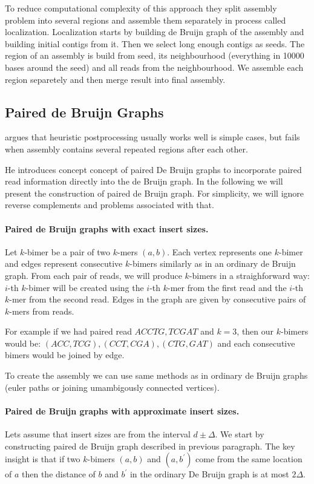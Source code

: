 To reduce computational complexity of this approach they split assembly problem
into several regions and assemble them separately in process called localization.
Localization starts by building de Bruijn graph of the assembly and building initial
contigs from it. Then we select long enough contigs as seeds. 
The region of an assembly is build from seed, its neighbourhood (everything
in 10000 bases around the seed) and all reads from the neighbourhood.
We assemble each region separetely and then merge result into final assembly.

\subsection{Paired de Bruijn Graphs}

\citet{Paired} argues that heuristic postprocessing
usually works well is simple cases, but fails when assembly contains
several repeated regions after each other.

He introduces concept concept of paired De Bruijn graphs to incorporate paired read
information directly into the de Bruijn graph.
In the following we will present the construction of 
paired de Bruijn graph.
For simplicity, we will ignore reverse complements and problems associated with that.

\paragraph{Paired de Bruijn graphs with exact insert sizes.}
Let $k$-bimer be a pair of two $k$-mers $(a, b)$. Each vertex 
represents one $k$-bimer and edges represent
consecutive $k$-bimers similarly as in an ordinary de Bruijn graph. 
From each pair of reads, we will produce $k$-bimers in a straighforward way:
$i$-th $k$-bimer will be created using the $i$-th $k$-mer from the first read and 
the $i$-th $k$-mer from the second read.
Edges in the graph are given by consecutive pairs of $k$-mers from reads.

For example if we had paired read $ACCTG, TCGAT$ and $k = 3$, then our
$k$-bimers would be: $(ACC, TCG), (CCT, CGA), (CTG, GAT)$ and each consecutive bimers
would be joined by edge.

To create the assembly we can use same methods as in ordinary de Bruijn graphs
(euler paths or joining umambigously connected vertices).

\paragraph{Paired de Bruijn graphs with approximate insert sizes.}
Lets assume that insert sizes are from the interval $d \pm \Delta$.
We start by constructing paired de Bruijn graph described in previous paragraph.
The key insight is that if two $k$-bimers $(a, b)$ and $(a, b^{'})$ come from
the same location of $a$ then the distance of $b$ and $b^{'}$ in the ordinary De Bruijn graph is at
most $2\Delta$.


